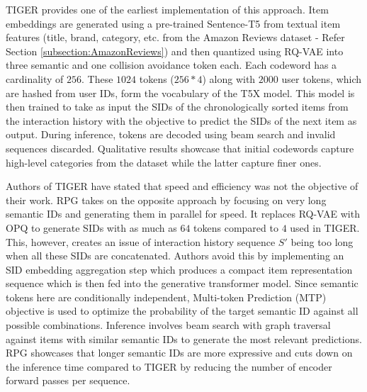 \documentclass[11pt,a4paper]{article}
\begin{document}
TIGER \cite{2023TIGER_rajput2023recommendersystemsgenerativeretrieval} provides one of the earliest implementation of this approach. Item embeddings are generated using a pre-trained Sentence-T5 from textual item features (title, brand, category, etc. from the Amazon Reviews dataset - Refer Section \ref{subsection:AmazonReviews}) and then quantized using RQ-VAE into three semantic and one collision avoidance token each. Each codeword has a cardinality of $256$. These $1024$ tokens ($256 * 4$) along with $2000$ user tokens, which are hashed from user IDs, form the vocabulary of the T5X model. This model is then trained to take as input the SIDs of the chronologically sorted items from the interaction history with the objective to predict the SIDs of the next item as output. During inference, tokens are decoded using beam search and invalid sequences discarded. Qualitative results showcase that initial codewords capture high-level categories from the dataset while the latter capture finer ones.

Authors of TIGER have stated that speed and efficiency was not the objective of their work. RPG \cite{2025RPG_hou2025generatinglongsemanticids} takes on the opposite approach by focusing on very long semantic IDs and generating them in parallel for speed. It replaces RQ-VAE with OPQ to generate SIDs with as much as $64$ tokens compared to $4$ used in TIGER. This, however, creates an issue of interaction history sequence $S'$ being too long when all these SIDs are concatenated. Authors avoid this by implementing an SID embedding aggregation step which produces a compact item representation sequence which is then fed into the generative transformer model. Since semantic tokens here are conditionally independent, Multi-token Prediction (MTP) objective is used to optimize the probability of the target semantic ID against all possible combinations. Inference involves beam search with graph traversal against items with similar semantic IDs to generate the most relevant predictions. RPG showcases that longer semantic IDs are more expressive and cuts down on the inference time compared to TIGER by reducing the number of encoder forward passes per sequence.
\end{document}
